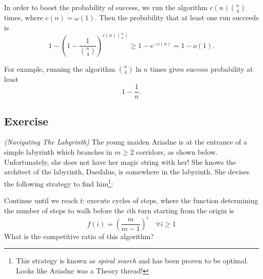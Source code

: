 \documentclass[14pt]{extreport}
\newcounter{counter}
\newcommand{\Exercise}{Exercise \stepcounter{counter}\thecounter}
\begin{document}
    In order to boost the probability of success, we run the algorithm $c(n)\binom{n}{4}$ times, where $c(n) = \omega(1)$. Then the probability that at least one run succeeds is
    $$1 - \left(1 - \frac{1}{\binom{n}{4}}\right)^{c(n)\binom{n}{4}} \ge 1 - e^{-c(n)} = 1 - o(1).$$

    For example, running the algorithm $\binom{n}{4}\ln n$ times gives success probability at least
    $$1 - \frac{1}{n}.$$


\subsection*{\Exercise}
    \textit{(Navigating The Labyrinth)}
    The young maiden Ariadne is at the entrance of a simple labyrinth which branches in $m \ge 2$ corridors, as shown below. Unfortunately, she does not have her magic string with her! She knows the architect of the labyrinth, Daedalus, is somewhere in the labyrinth. She devises the following strategy to find him\footnote{This strategy is known as \textit{spiral search} and has been proven to be optimal. Looks like Ariadne was a Theory thread!}:

    \vspace{3mm}
    Continue until we reach $t$: execute cycles of steps, where the function determining the number of steps to walk before the $i$th turn starting from the origin is
    $$f(i) = \left(\frac{m}{m - 1}\right)^{i} \quad\forall i \ge 1$$
    What is the competitive ratio of this algorithm?
\end{document}

